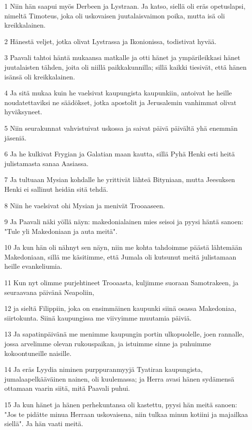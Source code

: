 \par 1 Niin hän saapui myös Derbeen ja Lystraan. Ja katso, siellä oli eräs opetuslapsi, nimeltä Timoteus, joka oli uskovaisen juutalaisvaimon poika, mutta isä oli kreikkalainen.
\par 2 Hänestä veljet, jotka olivat Lystrassa ja Ikonionissa, todistivat hyvää.
\par 3 Paavali tahtoi häntä mukaansa matkalle ja otti hänet ja ympärileikkasi hänet juutalaisten tähden, joita oli niillä paikkakunnilla; sillä kaikki tiesivät, että hänen isänsä oli kreikkalainen.
\par 4 Ja sitä mukaa kuin he vaelsivat kaupungista kaupunkiin, antoivat he heille noudatettaviksi ne säädökset, jotka apostolit ja Jerusalemin vanhimmat olivat hyväksyneet.
\par 5 Niin seurakunnat vahvistuivat uskossa ja saivat päivä päivältä yhä enemmän jäseniä.
\par 6 Ja he kulkivat Frygian ja Galatian maan kautta, sillä Pyhä Henki esti heitä julistamasta sanaa Aasiassa.
\par 7 Ja tultuaan Mysian kohdalle he yrittivät lähteä Bityniaan, mutta Jeesuksen Henki ei sallinut heidän sitä tehdä.
\par 8 Niin he vaelsivat ohi Mysian ja menivät Trooaaseen.
\par 9 Ja Paavali näki yöllä näyn: makedonialainen mies seisoi ja pyysi häntä sanoen: "Tule yli Makedoniaan ja auta meitä".
\par 10 Ja kun hän oli nähnyt sen näyn, niin me kohta tahdoimme päästä lähtemään Makedoniaan, sillä me käsitimme, että Jumala oli kutsunut meitä julistamaan heille evankeliumia.
\par 11 Kun nyt olimme purjehtineet Trooaasta, kuljimme suoraan Samotrakeen, ja seuraavana päivänä Neapoliin,
\par 12 ja sieltä Filippiin, joka on ensimmäinen kaupunki siinä osassa Makedoniaa, siirtokunta. Siinä kaupungissa me viivyimme muutamia päiviä.
\par 13 Ja sapatinpäivänä me menimme kaupungin portin ulkopuolelle, joen rannalle, jossa arvelimme olevan rukouspaikan, ja istuimme sinne ja puhuimme kokoontuneille naisille.
\par 14 Ja eräs Lyydia niminen purppuranmyyjä Tyatiran kaupungista, jumalaapelkääväinen nainen, oli kuulemassa; ja Herra avasi hänen sydämensä ottamaan vaarin siitä, mitä Paavali puhui.
\par 15 Ja kun hänet ja hänen perhekuntansa oli kastettu, pyysi hän meitä sanoen: "Jos te pidätte minua Herraan uskovaisena, niin tulkaa minun kotiini ja majailkaa siellä". Ja hän vaati meitä.
